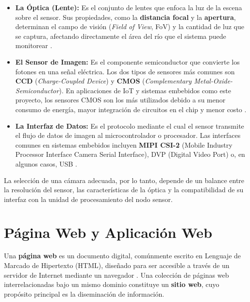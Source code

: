 \begin{itemize}
    \item \textbf{La Óptica (Lente):} Es el conjunto de lentes que enfoca la luz de la escena sobre el sensor. Sus propiedades, como la \textbf{distancia focal} y la \textbf{apertura}, determinan el campo de visión (\textit{Field of View}, FoV) y la cantidad de luz que se captura, afectando directamente el área del río que el sistema puede monitorear \cite{szeliski2010computer}.

    \item \textbf{El Sensor de Imagen:} Es el componente semiconductor que convierte los fotones en una señal eléctrica. Los dos tipos de sensores más comunes son \textbf{CCD} (\textit{Charge-Coupled Device}) y \textbf{CMOS} (\textit{Complementary Metal-Oxide-Semiconductor}). En aplicaciones de IoT y sistemas embebidos como este proyecto, los sensores CMOS son los más utilizados debido a su menor consumo de energía, mayor integración de circuitos en el chip y menor costo \cite{fossum1997cmos}.

    \item \textbf{La Interfaz de Datos:} Es el protocolo mediante el cual el sensor transmite el flujo de datos de imagen al microcontrolador o procesador. Las interfaces comunes en sistemas embebidos incluyen \textbf{MIPI CSI-2} (Mobile Industry Processor Interface Camera Serial Interface), DVP (Digital Video Port) o, en algunos casos, USB \cite{mipi2019csi}.
\end{itemize}

La selección de una cámara adecuada, por lo tanto, depende de un balance entre la resolución del sensor, las características de la óptica y la compatibilidad de su interfaz con la unidad de procesamiento del nodo sensor.


\section{Página Web y Aplicación Web}
\label{sec:pagina_web}

Una \textbf{página web} es un documento digital, comúnmente escrito en Lenguaje de Marcado de Hipertexto (HTML), diseñado para ser accesible a través de un servidor de Internet mediante un navegador \cite{redalyc2006}. Una colección de páginas web interrelacionadas bajo un mismo dominio constituye un \textbf{sitio web}, cuyo propósito principal es la diseminación de información.

